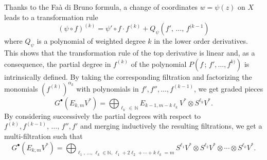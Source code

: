 \documentclass[AHL,Unicode,longabstracts,published]{cedram}
\newcommand*\bN{\mathbb{N}}
\begin{document}
Thanks to the Faà di Bruno formula, a change of coordinates $w=\psi(z)$ on
$X$ leads to a transformation rule
\[
(\psi\circ f)^{(k)}=\psi'\circ f\cdot f^{(k)}+Q_\psi\left(f',\,\dotsc,\,f^{(k-1}\right)
\]
where $Q_\psi$ is a polynomial of weighted degree $k$ in the lower order derivatives. This shows that the transformation rule of the top derivative is linear and, as a consequence, the partial degree in $f^{(k)}$ of the polynomial $P(f\,;\,f',\dotsc,f^{k)})$ is intrinsically defined. By taking the corresponding filtration and factorizing the monomials
$(f^{(k)})^{\alpha_k}$ with polynomials in $f',f'',\dotsc,f^{(k-1)}$, we get graded pieces
\[
G^\bullet\left(E_{k,m}V^*\right)=\bigoplus_{\ell_k\,\in\,\bN} E_{k-1,m-k\ell_k}V^*\otimes S^{\ell_k}V^*.
\]
By considering successively the partial degrees with respect to $f^{(k)}, f^{(k-1)},\,\dotsc,\,f'', f'$ and merging inductively the resulting filtrations, we get a multi-filtration such that
\begin{equation}\label{eq:graded_bundle}
G^\bullet\left(E_{k,m}V^*\right)=\bigoplus_{\ell_1,\,\dotsc,\,\ell_k\in\bN,\,
\ell_1+2\ell_2+\cdots+k\ell_k=m}S^{\ell_1}V^*\otimes S^{\ell_2}V^*\otimes\cdots
\otimes S^{\ell_k}V^*.
\end{equation}
\end{document}
